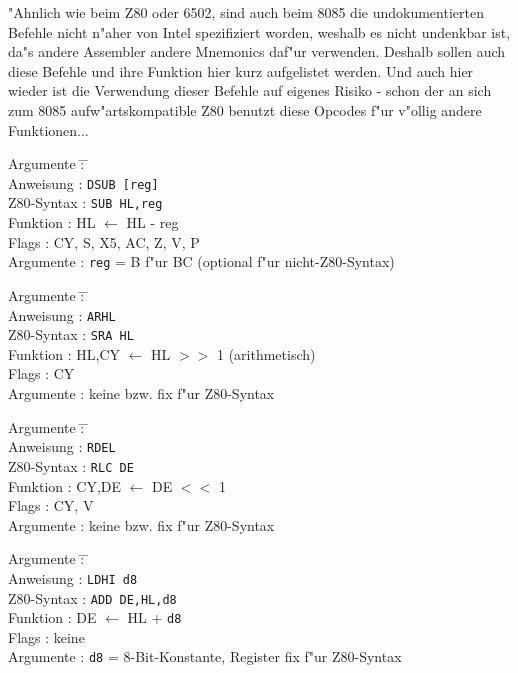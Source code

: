 \documentclass[12pt,a4paper,twoside]{report}
\newcommand{\tty}[1]{{\tt #1}}
\begin{document}
"Ahnlich wie beim Z80 oder 6502, sind auch beim 8085 die undokumentierten
Befehle nicht n"aher von Intel spezifiziert worden, weshalb es nicht
undenkbar ist, da"s andere Assembler andere Mnemonics daf"ur verwenden.
Deshalb sollen auch diese Befehle und ihre Funktion hier kurz aufgelistet
werden.  Und auch hier wieder ist die Verwendung dieser Befehle auf
eigenes Risiko - schon der an sich zum 8085 aufw"artskompatible Z80
benutzt diese Opcodes f"ur v"ollig andere Funktionen...

\begin{tabbing}
Argumente         \= : \= \kill \\
Anweisung         \> : \> \tty{DSUB [reg]} \\
Z80-Syntax        \> : \> \tty{SUB HL,reg} \\
Funktion          \> : \> HL $\leftarrow$ HL - reg \\
Flags             \> : \> CY, S, X5, AC, Z, V, P \\
Argumente         \> : \> \tty{reg} = B f"ur BC (optional f"ur nicht-Z80-Syntax) \\
\end{tabbing}

\begin{tabbing}
Argumente         \= : \= \kill \\
Anweisung         \> : \> \tty{ARHL} \\
Z80-Syntax        \> : \> \tty{SRA HL} \\
Funktion          \> : \> HL,CY $\leftarrow$ HL $>>$ 1 (arithmetisch) \\
Flags             \> : \> CY \\
Argumente         \> : \> keine bzw. fix f"ur Z80-Syntax \\
\end{tabbing}

\begin{tabbing}
Argumente         \= : \= \kill \\
Anweisung         \> : \> \tty{RDEL} \\
Z80-Syntax        \> : \> \tty{RLC DE} \\
Funktion          \> : \> CY,DE $\leftarrow$ DE $<<$ 1 \\
Flags             \> : \> CY, V \\
Argumente         \> : \> keine bzw. fix f"ur Z80-Syntax \\
\end{tabbing}

\begin{tabbing}
Argumente         \= : \= \kill \\
Anweisung         \> : \> \tty{LDHI d8} \\
Z80-Syntax        \> : \> \tty{ADD DE,HL,d8} \\
Funktion          \> : \> DE $\leftarrow$ HL + {\tt d8} \\
Flags             \> : \> keine \\
Argumente         \> : \> {\tt d8} = 8-Bit-Konstante, Register fix f"ur Z80-Syntax \\
\end{tabbing}
\end{document}
